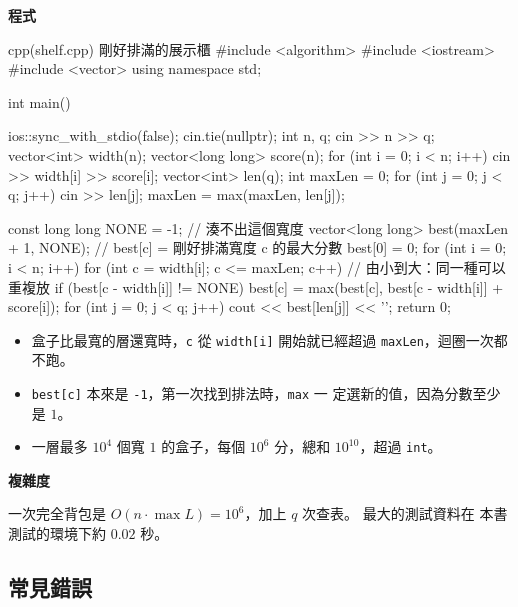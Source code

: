 \textbf{程式}

\begin{example}[label=ex:shelf]{cpp}{(shelf.cpp) 剛好排滿的展示櫃}
#include <algorithm>
#include <iostream>
#include <vector>
using namespace std;

int main() {
    ios::sync_with_stdio(false);
    cin.tie(nullptr);
    int n, q;
    cin >> n >> q;
    vector<int> width(n);
    vector<long long> score(n);
    for (int i = 0; i < n; i++) {
        cin >> width[i] >> score[i];
    }
    vector<int> len(q);
    int maxLen = 0;
    for (int j = 0; j < q; j++) {
        cin >> len[j];
        maxLen = max(maxLen, len[j]);
    }

    const long long NONE = -1;                // 湊不出這個寬度
    vector<long long> best(maxLen + 1, NONE); // best[c] = 剛好排滿寬度 c 的最大分數
    best[0] = 0;
    for (int i = 0; i < n; i++) {
        for (int c = width[i]; c <= maxLen; c++) {   // 由小到大：同一種可以重複放
            if (best[c - width[i]] != NONE) {
                best[c] = max(best[c], best[c - width[i]] + score[i]);
            }
        }
    }
    for (int j = 0; j < q; j++) {
        cout << best[len[j]] << '\n';
    }
    return 0;
}
\end{example}


\begin{itemize}
\item 盒子比最寬的層還寬時，\texttt{c} 從 \texttt{width[i]} 開始就已經超過
\texttt{maxLen}，迴圈一次都不跑。
\item \texttt{best[c]} 本來是 \texttt{-1}，第一次找到排法時，\texttt{max} 一
定選新的值，因為分數至少是 $1$。
\item 一層最多 $10^4$ 個寬 $1$ 的盒子，每個 $10^6$ 分，總和 $10^{10}$，超過
\texttt{int}。
\end{itemize}

\textbf{複雜度}

一次完全背包是 $O(n \cdot \max L) = 10^6$，加上 $q$ 次查表。 最大的測試資料在
本書測試的環境下約 $0.02$ 秒。

\subsection{常見錯誤}

